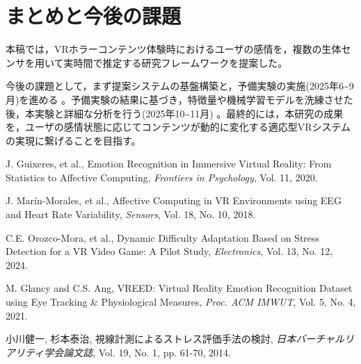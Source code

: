 \documentclass[paper=a4paper,fontsize=10pt,jafontscale=0.925,twocolumn]{jlreq}
\begin{document}
\section{まとめと今後の課題}

本稿では，VRホラーコンテンツ体験時におけるユーザの感情を，複数の生体センサを用いて実時間で推定する研究フレームワークを提案した。

今後の課題として，まず提案システムの基盤構築と，予備実験の実施(2025年6\textasciitilde9月)を進める 。予備実験の結果に基づき，特徴量や機械学習モデルを洗練させた後，本実験と詳細な分析を行う(2025年10\textasciitilde11月) 。最終的には，本研究の成果を，ユーザの感情状態に応じてコンテンツが動的に変化する適応型VRシステムの実現に繋げることを目指す。

\begin{thebibliography}{9}

J. Guixeres, et al., Emotion Recognition in Immersive Virtual Reality: From Statistics to Affective Computing, \textit{Frontiers in Psychology}, Vol. 11, 2020. 

J. Marín-Morales, et al., Affective Computing in VR Environments using EEG and Heart Rate Variability, \textit{Sensors}, Vol. 18, No. 10, 2018. 

C.E. Orozco-Mora, et al., Dynamic Difficulty Adaptation Based on Stress Detection for a VR Video Game: A Pilot Study, \textit{Electronics}, Vol. 13, No. 12, 2024. 

M. Glancy and C.S. Ang, VREED: Virtual Reality Emotion Recognition Dataset using Eye Tracking \& Physiological Measures, \textit{Proc. ACM IMWUT}, Vol. 5, No. 4, 2021. 

小川健一, 杉本泰治, 視線計測によるストレス評価手法の検討, \textit{日本バーチャルリアリティ学会論文誌}, Vol. 19, No. 1, pp. 61-70, 2014. 

\end{thebibliography}
\end{document}
